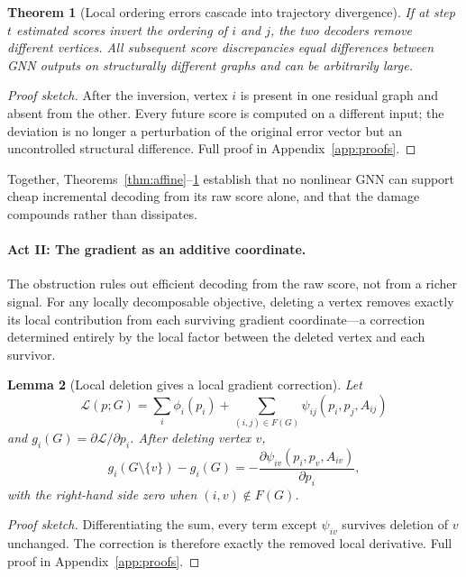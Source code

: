 \documentclass[11pt]{article}
\theoremstyle{plain}
\newtheorem{theorem}{Theorem}[section]
\newtheorem{lemma}[theorem]{Lemma}
\theoremstyle{remark}
\begin{document}
\begin{theorem}[Local ordering errors cascade into trajectory divergence]
  \label{thm:propagation}
  If at step $t$ estimated scores invert the ordering of $i$ and $j$, the two
  decoders remove different vertices. All subsequent score discrepancies equal
  differences between GNN outputs on structurally different graphs and can be
  arbitrarily large.
\end{theorem}
\begin{proof}[Proof sketch]
  After the inversion, vertex $i$ is present in one residual graph and absent from
  the other. Every future score is computed on a different input; the deviation is
  no longer a perturbation of the original error vector but an uncontrolled
  structural difference. Full proof in Appendix~\ref{app:proofs}.
\end{proof}




Together, Theorems~\ref{thm:affine}--\ref{thm:propagation} establish that no
nonlinear GNN can support cheap incremental decoding from its raw score alone, and
that the damage compounds rather than dissipates.

\paragraph{Act II: The gradient as an additive coordinate.}
The obstruction rules out efficient decoding from the raw score, not from a
richer signal. For any locally decomposable objective, deleting a vertex removes
exactly its local contribution from each surviving gradient coordinate---a
correction determined entirely by the local factor between the deleted vertex and
each survivor.

\begin{lemma}[Local deletion gives a local gradient correction]
  \label{lem:local_gradient_correction}
  Let \[\mathcal{L}(p;G) = \sum_i \phi_i(p_i) + \sum_{(i,j)\in F(G)}
  \psi_{ij}(p_i,p_j,A_{ij})\] and $g_i(G) = \partial\mathcal{L}/\partial p_i$.
  After deleting vertex $v$,
  \[
    g_i(G\setminus\{v\}) - g_i(G)
    =
    -\frac{\partial \psi_{iv}(p_i,p_v,A_{iv})}{\partial p_i},
  \]
  with the right-hand side zero when $(i,v)\notin F(G)$.
\end{lemma}
\begin{proof}[Proof sketch]
  Differentiating the sum, every term except $\psi_{iv}$ survives deletion of $v$
  unchanged. The correction is therefore exactly the removed local derivative.
  Full proof in Appendix~\ref{app:proofs}.
\end{proof}
\end{document}
